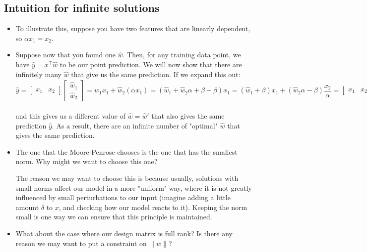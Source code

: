 \subsection{Intuition for infinite solutions}
\begin{itemize}
	\item To illustrate this, suppose you have two features that are linearly
		dependent, so \( \alpha x_1 = x_2 \). 
	\item Suppose now that you found one \( \hat{w} \). Then, for any training data
		point, we have \( \hat{y} = x^{\top} \hat{w} \) to be our point prediction.
		We will now show that there are infinitely many \( \hat{w} \) that give us
		the same prediction. If we expand this out:
		\[
			\hat{y} = \begin{bmatrix} x_1 & x_2  \end{bmatrix} 
			\begin{bmatrix} \hat{w}_1 \\ \hat{w}_2 \end{bmatrix}
			= \hat{w}_1 x_1 + \hat{w}_2 (\alpha x_1) = (\hat{w}_1 + \hat{w}_2 \alpha +
			\beta - \beta)x_1 = (\hat{w}_1 + \beta) x_1 + (\hat{w}_2 \alpha - \beta)
			\frac{x_2}{\alpha} = 
			\begin{bmatrix}  x_1 & x_2 \end{bmatrix}
			\underbrace{\begin{bmatrix} \hat{w}_1 + \beta \\ \frac{\hat{w}_2 \alpha -
			\beta}{\alpha} \end{bmatrix}}_{\hat{w}'}
		\]
		and this gives us a different value of \( \hat{w} = \hat{w}' \) that also gives the same
		prediction \( \hat{y} \). As a result, there are an infinite number of
		"optimal" \( \hat{w} \) that gives the same prediction. 
	\item The one that the Moore-Penrose chooses is the one that has the smallest
		norm. Why might we want to choose this one? 

		The reason we may want to choose this is because usually, solutions with
		small norms affect our model in a more "uniform" way, where it is not greatly
		influenced by small perturbations to our input (imagine adding a little
		amount \( \delta \) to \( x \), and checking how our model reacts to it). 
		Keeping the norm small is one
		way we can ensure that this principle is maintained.  
	\item What about the case where our design matrix is full rank? Is there any
		reason we may want to put a constraint on \( \|w\| \)?   
\end{itemize}
